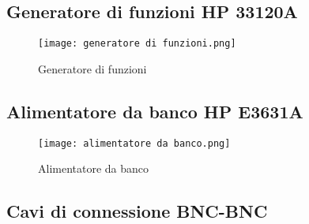 \subsection{\textbf{Generatore di funzioni HP 33120A}}
\begin{figure}
    \centering
    \texttt{[image: generatore di funzioni.png]}
    \caption{Generatore di funzioni}
    \label{fig:enter-label}
\end{figure}
\subsection{\textbf{Alimentatore da banco HP E3631A}}
\begin{figure}
    \centering
    \texttt{[image: alimentatore da banco.png]}
    \caption{Alimentatore da banco}
    \label{fig:enter-label}
\end{figure}
\subsection{\textbf{Cavi di connessione BNC-BNC}}
\clearpage
